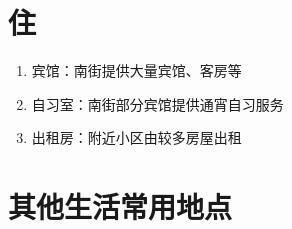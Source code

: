 \section[住]{住}
\begin{enumerate}
    \item 宾馆：南街提供大量宾馆、客房等
    \item 自习室：南街部分宾馆提供通宵自习服务
    \item 出租房：附近小区由较多房屋出租\footnotemark
\end{enumerate}

\section[其他生活常用地点]{其他生活常用地点}
\label{common_locations}
